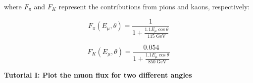 \documentclass[
  letterpaper,
  DIV=11,
  numbers=noendperiod]{scrreprt}
\begin{document}
where \(F_\pi\) and \(F_K\) represent the contributions from pions and
kaons, respectively:

\[F_\pi(E_\mu, \theta) = \frac{1}{1+\frac{1.1 E_\mu \cos\theta}{115 \;\mathrm{GeV}}}\]

\[F_K(E_\mu, \theta) = \frac{0.054}{1+\frac{1.1 E_\mu \cos\theta}{850\;\mathrm{GeV}}}\]

\begin{tcolorbox}[enhanced jigsaw, toprule=.15mm, colframe=quarto-callout-color-frame, bottomrule=.15mm, leftrule=.75mm, left=2mm, breakable, rightrule=.15mm, arc=.35mm, opacityback=0, colback=white]

\vspace{-3mm}\textbf{Tutorial I: Plot the muon flux for two different angles}\vspace{3mm}


\end{tcolorbox}
\end{document}
